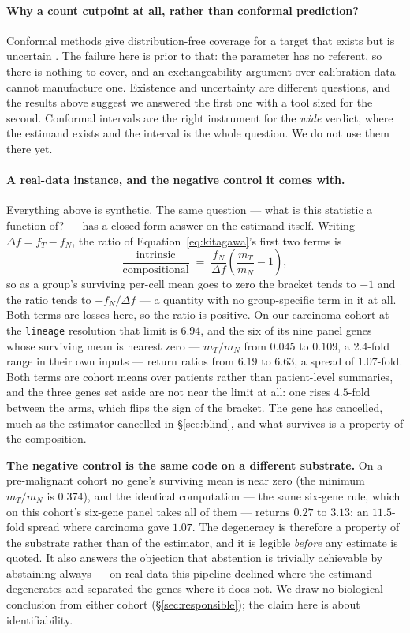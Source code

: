 \paragraph{Why a count cutpoint at all, rather than conformal prediction?}
Conformal methods give distribution-free coverage for a target that exists but
is uncertain \citep{vovk2005,angelopoulos2023}. The failure here is prior to
that: the parameter has no referent, so there is nothing to cover, and an
exchangeability argument over calibration data cannot manufacture one. Existence
and uncertainty are different questions, and the results above suggest we
answered the first one with a tool sized for the second. Conformal intervals are
the right instrument for the \emph{wide} verdict, where the estimand exists and
the interval is the whole question. We do not use them there yet.

\paragraph{A real-data instance, and the negative control it comes with.}
Everything above is synthetic. The same question --- what is this statistic a
function of? --- has a closed-form answer on the estimand itself. Writing
$\Delta f = f_T - f_N$, the ratio of Equation~\ref{eq:kitagawa}'s first two
terms is
\[
\frac{\text{intrinsic}}{\text{compositional}}
\;=\; \frac{f_N}{\Delta f}\left(\frac{m_T}{m_N} - 1\right),
\]
so as a group's surviving per-cell mean goes to zero the bracket tends to $-1$
and the ratio tends to $-f_N/\Delta f$ --- a quantity with no group-specific
term in it at all. Both terms are losses here, so the ratio is positive. On our carcinoma cohort at
the \texttt{lineage} resolution that limit is $6.94$, and the six of its nine
panel genes whose surviving mean is nearest zero --- $m_T/m_N$ from $0.045$ to
$0.109$, a 2.4-fold range in their own inputs --- return ratios from $6.19$ to
$6.63$, a spread of $1.07$-fold. Both terms are cohort means over patients
rather than patient-level summaries, and the three genes set aside are not near
the limit at all: one rises $4.5$-fold between the arms, which flips the sign of
the bracket. The
gene has cancelled, much as the estimator cancelled in \S\ref{sec:blind}, and
what survives is a property of the composition.

\textbf{The negative control is the same code on a different substrate.} On a
pre-malignant cohort no gene's surviving mean is near zero (the minimum
$m_T/m_N$ is $0.374$), and the identical computation --- the same six-gene rule,
which on this cohort's six-gene panel takes all of them --- returns $0.27$ to
$3.13$: an $11.5$-fold spread where carcinoma gave $1.07$. The degeneracy is
therefore a property of the substrate rather than of the estimator, and it is
legible \emph{before} any estimate is quoted. It also answers the objection
that abstention is trivially achievable by abstaining always --- on real data
this pipeline declined where the estimand degenerates and separated the genes
where it does not. We draw no biological conclusion from either cohort
(\S\ref{sec:responsible}); the claim here is about identifiability.


